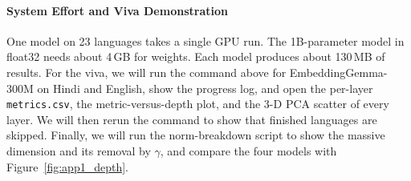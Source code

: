 \paragraph{System Effort and Viva Demonstration}
One model on 23 languages takes a single GPU run. The 1B-parameter model in float32 needs about 4\,GB for weights. Each model produces about 130\,MB of results. For the viva, we will run the command above for EmbeddingGemma-300M on Hindi and English, show the progress log, and open the per-layer \texttt{metrics.csv}, the metric-versus-depth plot, and the 3-D PCA scatter of every layer. We will then rerun the command to show that finished languages are skipped. Finally, we will run the norm-breakdown script to show the massive dimension and its removal by $\gamma$, and compare the four models with Figure~\ref{fig:app1_depth}.
